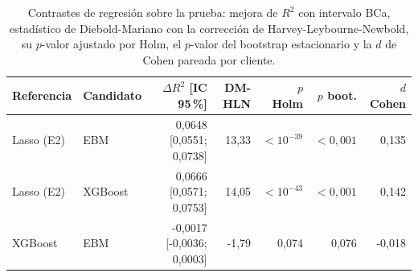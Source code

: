 \begin{table}[htbp]
\caption{Contrastes de regresión sobre la prueba: mejora de $R^2$ con intervalo BCa, estadístico de Diebold-Mariano con la corrección de Harvey-Leybourne-Newbold, su $p$-valor ajustado por Holm, el $p$-valor del bootstrap estacionario y la $d$ de Cohen pareada por cliente.}\label{tab:contrastes_reg}
\tiny\setlength{\tabcolsep}{2.8pt}
\begin{tabular}{llrrrrr}
\toprule
\textbf{Referencia} & \textbf{Candidato} & \textbf{$\Delta R^2$ [IC 95\,\%]} & \textbf{DM-HLN} & \textbf{$p$ Holm} & \textbf{$p$ boot.} & \textbf{$d$ Cohen} \\
\midrule
Lasso (E2) & EBM & 0,0648 [0,0551; 0,0738] & 13,33 & $<10^{-39}$ & $<0{,}001$ & 0,135 \\
Lasso (E2) & XGBoost & 0,0666 [0,0571; 0,0753] & 14,05 & $<10^{-43}$ & $<0{,}001$ & 0,142 \\
XGBoost & EBM & -0,0017 [-0,0036; 0,0003] & -1,79 & 0,074 & 0,076 & -0,018 \\
\bottomrule
\end{tabular}
\end{table}
